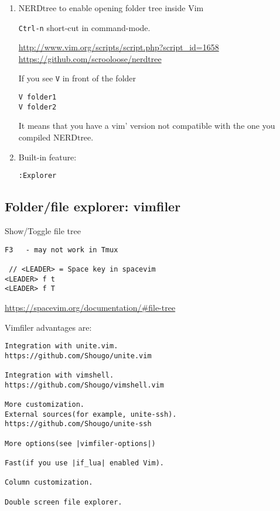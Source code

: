 \begin{enumerate}
  \item NERDtree to enable opening folder tree inside Vim

\verb!Ctrl-n! short-cut in command-mode.
  
 
  
\url{http://www.vim.org/scripts/script.php?script_id=1658}  
\url{https://github.com/scrooloose/nerdtree}
  
If you see \verb!V! in front of the folder
\begin{verbatim}
V folder1
V folder2
\end{verbatim}
It means that you have a vim' version not compatible with the one you compiled
NERDtree. 

  \item Built-in feature:

\begin{verbatim}
:Explorer
\end{verbatim}
  
\end{enumerate}




\subsection{Folder/file explorer: vimfiler}	
\label{sec:vim-plugin-vimfiler}
\label{sec:vimfiler}


Show/Toggle file tree
\begin{verbatim}
F3   - may not work in Tmux

 // <LEADER> = Space key in spacevim
<LEADER> f t
<LEADER> f T  
\end{verbatim}
\url{https://spacevim.org/documentation/#file-tree}

Vimfiler advantages are:
\begin{verbatim}
Integration with unite.vim.
https://github.com/Shougo/unite.vim

Integration with vimshell.
https://github.com/Shougo/vimshell.vim

More customization.
External sources(for example, unite-ssh).
https://github.com/Shougo/unite-ssh

More options(see |vimfiler-options|)

Fast(if you use |if_lua| enabled Vim).

Column customization.

Double screen file explorer.
\end{verbatim}

